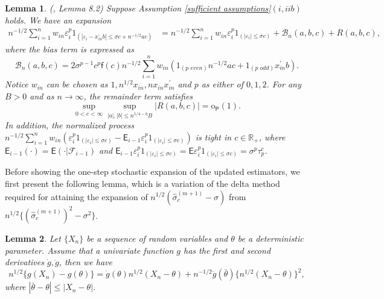 \documentclass[11pt, letterpaper]{article}
\newtheorem{lemma}{Lemma}
\numberwithin{algorithm}{section}
\numberwithin{assumption}{section}
\numberwithin{lemma}{section}
\numberwithin{theorem}{section}
\numberwithin{corollary}{section}
\numberwithin{remark}{section}
\numberwithin{equation}{section}
\numberwithin{figure}{section}
\numberwithin{table}{section}
\begin{document}
\begin{lemma} \label{asymptotic expansion and tightness of two-sided empirical processes}
(\cite{jiao2018testing}, Lemma 8.2) Suppose Assumption \ref{sufficient assumptions}$(i, iib)$ holds. We have an expansion
\begin{align*}
n^{-1/2} \sum_{i=1}^{n} w_{in} \varepsilon_{i}^{p} 1_{( |\varepsilon_{i} - x_{in}^{\prime}b| \le \sigma c + n^{-1/2} a c )} & = n^{-1/2} \sum_{i=1}^{n} w_{in} \varepsilon_{i}^{p} 1_{(|\varepsilon_{i}| \le \sigma c)} + \mathcal{B}_{n}(a, b, c) + R(a, b, c),
\end{align*}
where the bias term is expressed as
\begin{equation*}
\mathcal{B}_{n}(a, b, c) = 2 \sigma^{p - 1} c^{p} \mathsf{f}(c) n^{-1/2} \sum_{i=1}^{n} w_{in} ( 1_{(p \,\, even)} n^{-1/2} a c  + 1_{(p \,\, odd)} x_{in}^{\prime} b ).
\end{equation*}
Notice $w_{in}$ can be chosen as $1, n^{1/2} x_{in}, n x_{in} x_{in}^{\prime}$ and $p$ as either of $0, 1, 2$. For any $B > 0$ and as $n \to \infty$, the remainder term satisfies
\begin{equation*}
\sup_{0 < c < \infty} \sup_{|a|, |b| \le n^{1/4 - \eta} B} |R(a, b, c)| = \mathrm{o}_{\mathsf{P}}(1).
\end{equation*}
In addition, the normalized process $n^{-1/2} \sum_{i=1}^{n} w_{in} (\varepsilon_{i}^{p} 1_{( |\varepsilon_{i}| \le \sigma c)} - \mathsf{E}_{i - 1} \varepsilon_{i}^{p} 1_{( |\varepsilon_{i}| \le \sigma c)})$ is tight in $c \in \mathbb{R}_{+}$, where $\mathsf{E}_{i - 1}(\cdot) = \mathsf{E}(\cdot | \mathcal{F}_{i - 1})$ and $\mathsf{E}_{i - 1} \varepsilon_{i}^{p} 1_{( |\varepsilon_{i}| \le \sigma c)} = \mathsf{E} \varepsilon_{i}^{p} 1_{( |\varepsilon_{i}| \le \sigma c)} = \sigma^{p} \tau_{p}^{c}$.
\end{lemma}

Before showing the one-step stochastic expansion of the updated estimators, we first present the following lemma, which is a variation of the delta method required for attaining the expansion of $n^{1/2} (\widehat{\sigma}_{c}^{(m + 1)} - \sigma)$ from $n^{1/2} \{ (\widehat{\sigma}_{c}^{(m + 1)})^{2} - \sigma^{2} \}$.

\begin{lemma} \label{variation of delta method}
Let $\{ X_{n} \}$ be a sequence of random variables and $\theta$ be a deterministic parameter. Assume that a univariate function $g$ has the first and second derivatives $\dot{g}, \ddot{g}$, then we have
\begin{equation*}
n^{1/2} \{ g(X_{n}) - g(\theta) \} = \dot{g}(\theta) n^{1/2} (X_{n} - \theta) + n^{-1/2} \ddot{g}(\bar{\theta}) \{ n^{1/2} (X_{n} - \theta) \}^{2},
\end{equation*}
where $|\bar{\theta} - \theta| \le |X_{n} - \theta|$.
\end{lemma}
\end{document}
